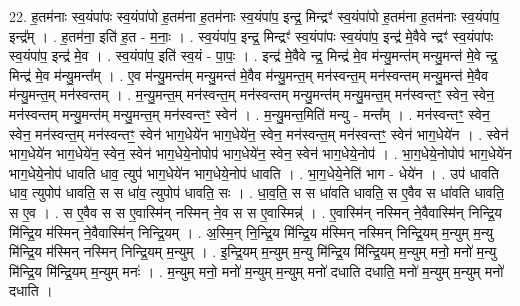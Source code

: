 \documentclass[17pt]{extarticle}
\begin{document}
22. ह॒तम॑नाः स्व॒यंपा॑पः स्व॒यंपा॑पो ह॒तम॑ना ह॒तम॑नाः स्व॒यंपा॑प॒ इन्द्र॒ मिन्द्रꣳ॑ स्व॒यंपा॑पो ह॒तम॑ना ह॒तम॑नाः स्व॒यंपा॑प॒ इन्द्र᳚म् । . ह॒तम॑ना॒ इति॑ ह॒त - म॒नाः॒ । . स्व॒यंपा॑प॒ इन्द्र॒ मिन्द्रꣳ॑ स्व॒यंपा॑पः स्व॒यंपा॑प॒ इन्द्र॑ मे॒वैवे न्द्रꣳ॑ स्व॒यंपा॑पः स्व॒यंपा॑प॒ इन्द्र॑ मे॒व । . स्व॒यंपा॑प॒ इति॑ स्व॒यं - पा॒पः॒ । . इन्द्र॑ मे॒वैवे न्द्र॒ मिन्द्र॑ मे॒व म॑न्यु॒मन्त॑म् मन्यु॒मन्त॑ मे॒वे न्द्र॒ मिन्द्र॑ मे॒व म॑न्यु॒मन्त᳚म् । . ए॒व म॑न्यु॒मन्त॑म् मन्यु॒मन्त॑ मे॒वैव म॑न्यु॒मन्त॒म् मन॑स्वन्त॒म् मन॑स्वन्तम् मन्यु॒मन्त॑ मे॒वैव म॑न्यु॒मन्त॒म् मन॑स्वन्तम् । . म॒न्यु॒मन्त॒म् मन॑स्वन्त॒म् मन॑स्वन्तम् मन्यु॒मन्त॑म् मन्यु॒मन्त॒म् मन॑स्वन्तꣳ॒॒ स्वेन॒ स्वेन॒ मन॑स्वन्तम् मन्यु॒मन्त॑म् मन्यु॒मन्त॒म् मन॑स्वन्तꣳ॒॒ स्वेन॑ । . म॒न्यु॒मन्त॒मिति॑ मन्यु - मन्त᳚म् । . मन॑स्वन्तꣳ॒॒ स्वेन॒ स्वेन॒ मन॑स्वन्त॒म् मन॑स्वन्तꣳ॒॒ स्वेन॑ भाग॒धेये॑न भाग॒धेये॑न॒ स्वेन॒ मन॑स्वन्त॒म् मन॑स्वन्तꣳ॒॒ स्वेन॑ भाग॒धेये॑न । . स्वेन॑ भाग॒धेये॑न भाग॒धेये॑न॒ स्वेन॒ स्वेन॑ भाग॒धेये॒नोपोप॑ भाग॒धेये॑न॒ स्वेन॒ स्वेन॑ भाग॒धेये॒नोप॑ । . भा॒ग॒धेये॒नोपोप॑ भाग॒धेये॑न भाग॒धेये॒नोप॑ धावति धाव॒ त्युप॑ भाग॒धेये॑न भाग॒धेये॒नोप॑ धावति । . भा॒ग॒धेये॒नेति॑ भाग - धेये॑न । . उप॑ धावति धाव॒ त्युपोप॑ धावति॒ स स धा॑व॒ त्युपोप॑ धावति॒ सः । . धा॒व॒ति॒ स स धा॑वति धावति॒ स ए॒वैव स धा॑वति धावति॒ स ए॒व । . स ए॒वैव स स ए॒वास्मि॑न् नस्मिन् ने॒व स स ए॒वास्मिन्न्॑ । . ए॒वास्मि॑न् नस्मिन् ने॒वैवास्मि॑न् निन्द्रि॒य मि॑न्द्रि॒य म॑स्मिन् ने॒वैवास्मि॑न् निन्द्रि॒यम् । . अ॒स्मि॒न् नि॒न्द्रि॒य मि॑न्द्रि॒य म॑स्मिन् नस्मिन् निन्द्रि॒यम् म॒न्युम् म॒न्यु मि॑न्द्रि॒य म॑स्मिन् नस्मिन् निन्द्रि॒यम् म॒न्युम् । . इ॒न्द्रि॒यम् म॒न्युम् म॒न्यु मि॑न्द्रि॒य मि॑न्द्रि॒यम् म॒न्युम् मनो॒ मनो॑ म॒न्यु मि॑न्द्रि॒य मि॑न्द्रि॒यम् म॒न्युम् मनः॑ । . म॒न्युम् मनो॒ मनो॑ म॒न्युम् म॒न्युम् मनो॑ दधाति दधाति॒ मनो॑ म॒न्युम् म॒न्युम् मनो॑ दधाति । \newline
\end{document}
